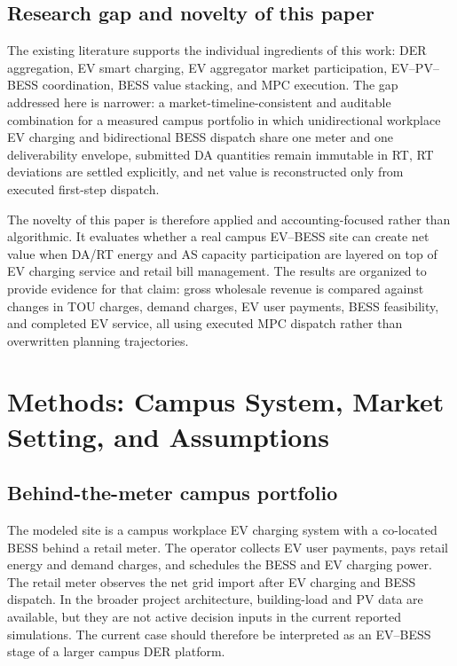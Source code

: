 \documentclass[final,5p,times]{elsarticle}
\begin{document}
\subsection{Research gap and novelty of this paper}
The existing literature supports the individual ingredients of this work: DER aggregation, EV smart charging, EV aggregator market participation, EV--PV--BESS coordination, BESS value stacking, and MPC execution. The gap addressed here is narrower: a market-timeline-consistent and auditable combination for a measured campus portfolio in which unidirectional workplace EV charging and bidirectional BESS dispatch share one meter and one deliverability envelope, submitted DA quantities remain immutable in RT, RT deviations are settled explicitly, and net value is reconstructed only from executed first-step dispatch.

The novelty of this paper is therefore applied and accounting-focused rather than algorithmic. It evaluates whether a real campus EV--BESS site can create net value when DA/RT energy and AS capacity participation are layered on top of EV charging service and retail bill management. The results are organized to provide evidence for that claim: gross wholesale revenue is compared against changes in TOU charges, demand charges, EV user payments, BESS feasibility, and completed EV service, all using executed MPC dispatch rather than overwritten planning trajectories.

\section{Methods: Campus System, Market Setting, and Assumptions}
\label{sec:system_description}

\subsection{Behind-the-meter campus portfolio}
The modeled site is a campus workplace EV charging system with a co-located BESS behind a retail meter. The operator collects EV user payments, pays retail energy and demand charges, and schedules the BESS and EV charging power. The retail meter observes the net grid import after EV charging and BESS dispatch. In the broader project architecture, building-load and PV data are available, but they are not active decision inputs in the current reported simulations. The current case should therefore be interpreted as an EV--BESS stage of a larger campus DER platform.
\end{document}
